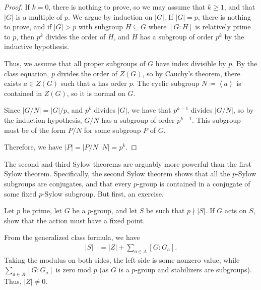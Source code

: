 \documentclass[10pt]{mypackage}
\begin{document}
\begin{proof}
  If $k = 0$, there is nothing to prove, so we may assume that $k\geq 1$, and that $\left\vert G \right\vert$ is a multiple of $p$. We argue by induction on $\left\vert G \right\vert$. If $\left\vert G \right\vert = p$, there is nothing to prove, and if $\left\vert G \right\vert > p$ with subgroup $H\subseteq G$ where $\left[ G:H \right]$ is relatively prime to $p$, then $p^{k}$ divides the order of $H$, and $H$ has a subgroup of order $p^{k}$ by the inductive hypothesis.\newline

  Thus, we assume that all proper subgroups of $G$ have index divisible by $p$. By the class equation, $p$ divides the order of $Z(G)$, so by Cauchy's theorem, there exists $a\in Z(G)$ such that $a$ has order $p$. The cyclic subgroup $N\coloneq \left\langle a \right\rangle$ is contained in $Z(G)$, so it is normal on $G$.\newline

  Since $\left\vert G/N \right\vert = \left\vert G \right\vert/p$, and $p^{k}$ divides $\left\vert G \right\vert$, we have that $p^{k-1}$ divides $\left\vert G/N \right\vert$, so by the induction hypothesis, $G/N$ has a subgroup of order $p^{k-1}$. This subgroup must be of the form $P/N$ for some subgroup $P$ of $G$.\newline

  Therefore, we have $\left\vert P \right\vert = \left\vert P/N \right\vert\left\vert N \right\vert = p^{k}$.
\end{proof}
The second and third Sylow theorems are arguably more powerful than the first Sylow theorem. Specifically, the second Sylow theorem shows that all the $p$-Sylow subgroups are conjugates, and that every $p$-group is contained in a conjugate of some fixed $p$-Sylow subgroup. But first, an exercise.
\begin{exercise}
  Let $p$ be prime, let $G$ be a $p$-group, and let $S$ be such that $p \nmid \left\vert S \right\vert$. If $G$ acts on $S$, show that the action must have a fixed point.
\end{exercise}
\begin{exercise}
  From the generalized class formula, we have
  \begin{align*}
    \left\vert S \right\vert &= \left\vert Z \right\vert + \sum_{a\in A} \left[ G:G_a \right].
  \end{align*}
  Taking the modulus on both sides, the left side is some nonzero value, while $\sum_{a\in A}\left[ G:G_a \right]$ is zero mod $p$ (as $G$ is a $p$-group and stabilizers are subgroups). Thus, $\left\vert Z \right\vert\neq 0$.
\end{exercise}
\end{document}
